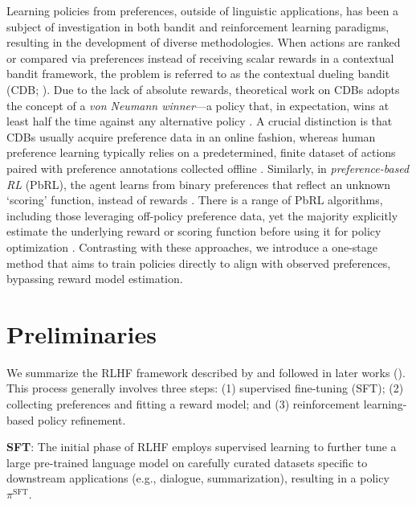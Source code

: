 Learning policies from preferences, outside of linguistic applications, has been a subject of investigation in both bandit and reinforcement learning paradigms, resulting in the development of diverse methodologies. When actions are ranked or compared via preferences instead of receiving scalar rewards in a contextual bandit framework, the problem is referred to as the contextual dueling bandit (CDB; \cite{yue2012karmed, dudik2015contextual}). Due to the lack of absolute rewards, theoretical work on CDBs adopts the concept of a \textit{von Neumann winner}—a policy that, in expectation, wins at least half the time against any alternative policy \citep{dudik2015contextual}. A crucial distinction is that CDBs usually acquire preference data in an online fashion, whereas human preference learning typically relies on a predetermined, finite dataset of actions paired with preference annotations collected offline \citep{yan2022human}. Similarly, in \textit{preference-based RL} (PbRL), the agent learns from binary preferences that reflect an unknown ‘scoring’ function, instead of rewards \citep{BusaFekete2014, ruiz2023dueling}. There is a range of PbRL algorithms, including those leveraging off-policy preference data, yet the majority explicitly estimate the underlying reward or scoring function before using it for policy optimization \citep{jain2013learning, BusaFekete2014, christiano2017deep, sadigh2017active, kupcsik2018learning}. Contrasting with these approaches, we introduce a one-stage method that aims to train policies directly to align with observed preferences, bypassing reward model estimation.

\section{Preliminaries}\label{section:prelims}

We summarize the RLHF framework described by \citeauthor{ziegler2020finetuning} and followed in later works (\citep{stiennon2022learning, bai2022training, ouyang2022training}). This process generally involves three steps: (1) supervised fine-tuning (SFT); (2) collecting preferences and fitting a reward model; and (3) reinforcement learning-based policy refinement.

\textbf{SFT}: The initial phase of RLHF employs supervised learning to further tune a large pre-trained language model on carefully curated datasets specific to downstream applications (e.g., dialogue, summarization), resulting in a policy $\pi^\text{SFT}$.

